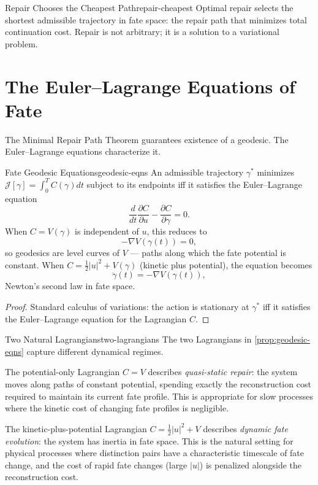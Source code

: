 \documentclass[12pt,twoside,openright]{book}
\providecommand{\fatePot}{V}
\providecommand{\contCost}{C}
\providecommand{\contAction}{\mathcal{J}}
\providecommand{\fateTraj}{\gamma}
\providecommand{\fateGeo}{\fateTraj^{*}}
\providecommand{\fateVel}{u}
\begin{document}
\begin{corollary}{Repair Chooses the Cheapest Path}{repair-cheapest}
Optimal repair selects the shortest admissible trajectory in
fate space: the repair path that minimizes total continuation
cost. Repair is not arbitrary; it is a solution to a variational
problem.
\end{corollary}

\section{The Euler--Lagrange Equations of Fate}

The Minimal Repair Path Theorem guarantees existence of a
geodesic. The Euler--Lagrange equations characterize it.

\begin{proposition}{Fate Geodesic Equations}{geodesic-eqns}
An admissible trajectory $\fateGeo$ minimizes
$\contAction[\fateTraj]=\int_0^T\contCost(\fateTraj)dt$
subject to its endpoints iff it satisfies the
Euler--Lagrange equation
\[
  \frac{d}{dt}\frac{\partial\contCost}{\partial\fateVel}
  - \frac{\partial\contCost}{\partial\fateTraj}
  = 0.
\]
When $\contCost=\fatePot(\fateTraj)$ is independent of
$\fateVel$, this reduces to
\[
  -\nabla\fatePot(\fateTraj(t)) = 0,
\]
so geodesics are level curves of $\fatePot$ --- paths along
which the fate potential is constant. When
$\contCost=\frac{1}{2}|\fateVel|^2+\fatePot(\fateTraj)$
(kinetic plus potential), the equation becomes
\[
  \ddot{\fateTraj}(t) = -\nabla\fatePot(\fateTraj(t)),
\]
Newton's second law in fate space.
\begin{proof}
Standard calculus of variations: the action is stationary at
$\fateGeo$ iff it satisfies the Euler--Lagrange equation for
the Lagrangian $\contCost$.
\end{proof}
\end{proposition}

\begin{remark}{Two Natural Lagrangians}{two-lagrangians}
The two Lagrangians in \cref{prop:geodesic-eqns} capture
different dynamical regimes.

The potential-only Lagrangian $\contCost=\fatePot$ describes
\emph{quasi-static repair}: the system moves along paths of
constant potential, spending exactly the reconstruction cost
required to maintain its current fate profile. This is
appropriate for slow processes where the kinetic cost of
changing fate profiles is negligible.

The kinetic-plus-potential Lagrangian
$\contCost=\frac{1}{2}|\fateVel|^2+\fatePot$ describes
\emph{dynamic fate evolution}: the system has inertia in fate
space. This is the natural setting for physical processes
where distinction pairs have a characteristic timescale of
fate change, and the cost of rapid fate changes (large
$|\fateVel|$) is penalized alongside the reconstruction cost.
\end{remark}
\end{document}
